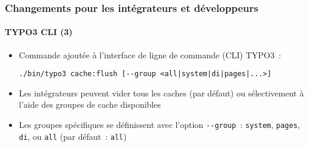 %

\begin{frame}[fragile]
	\frametitle{Changements pour les intégrateurs et développeurs}
	\framesubtitle{TYPO3 CLI (3)}


	\begin{itemize}
		\item Commande ajoutée à l'interface de ligne de commande (CLI) TYPO3~:
\begin{lstlisting}
./bin/typo3 cache:flush [--group <all|system|di|pages|...>]
\end{lstlisting}
		\item Les intégrateurs peuvent vider tous les caches (par défaut) ou sélectivement
			à l'aide des groupes de cache disponibles
		\item Les groupes spécifiques se définissent avec l'option
              			\texttt{-}\texttt{-group}~:\newline
			\small\texttt{system}, \texttt{pages}, \texttt{di}, ou \texttt{all} (par défaut~: \texttt{all})\normalsize
	\end{itemize}
\end{frame}

